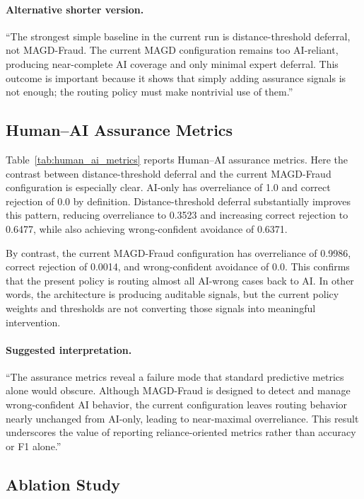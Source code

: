 \paragraph{Alternative shorter version.}
``The strongest simple baseline in the current run is distance-threshold deferral, not MAGD-Fraud. The current MAGD configuration remains too AI-reliant, producing near-complete AI coverage and only minimal expert deferral. This outcome is important because it shows that simply adding assurance signals is not enough; the routing policy must make nontrivial use of them.''

\subsection{Human--AI Assurance Metrics}
\label{subsec:results_assurance_metrics}

Table~\ref{tab:human_ai_metrics} reports Human--AI assurance metrics. Here the contrast between distance-threshold deferral and the current MAGD-Fraud configuration is especially clear. AI-only has overreliance of 1.0 and correct rejection of 0.0 by definition. Distance-threshold deferral substantially improves this pattern, reducing overreliance to 0.3523 and increasing correct rejection to 0.6477, while also achieving wrong-confident avoidance of 0.6371.

By contrast, the current MAGD-Fraud configuration has overreliance of 0.9986, correct rejection of 0.0014, and wrong-confident avoidance of 0.0. This confirms that the present policy is routing almost all AI-wrong cases back to AI. In other words, the architecture is producing auditable signals, but the current policy weights and thresholds are not converting those signals into meaningful intervention.

\paragraph{Suggested interpretation.}
``The assurance metrics reveal a failure mode that standard predictive metrics alone would obscure. Although MAGD-Fraud is designed to detect and manage wrong-confident AI behavior, the current configuration leaves routing behavior nearly unchanged from AI-only, leading to near-maximal overreliance. This result underscores the value of reporting reliance-oriented metrics rather than accuracy or F1 alone.''

\subsection{Ablation Study}
\label{subsec:results_ablation}

